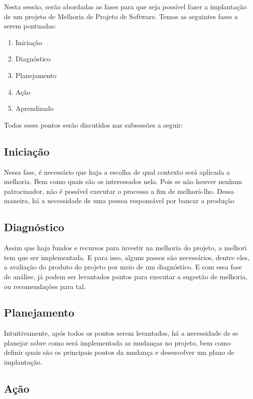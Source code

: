 Nesta sessão, serão abordadas as fases para que seja possível fazer a implantação
de um projeto de Melhoria de Projeto de Software. Temos as seguintes fases a
serem pontuadas:

\begin{enumerate}
    \item Iniciação
    \item Diagnóstico
    \item Planejamento
    \item Ação
    \item Aprendizado
\end{enumerate}

Todos esses pontos serão discutidos nas subsessões a seguir:

\subsection{Iniciação}
\label{sub:Iniciação}

Nessa fase, é necessário que haja a escolha de qual contexto será aplicada a melhoria.
Bem como quais são os interessados nela. Pois se não houver nenhum patrocinador,
não é possível executar o processo a fim de melhorá-lho. Dessa maneira, há a
necessidade de uma pessoa responsável por bancar a produção

\subsection{Diagnóstico}
\label{sub:Diagnóstico}

Assim que haja fundos e recursos para investir na melhoria do projeto, a melhori
tem que ser implementada. E para isso, alguns passos são necessários, dentre eles,
a avaliação do produto do projeto por meio de um diagnóstico. E com essa fase de
análise, já podem ser levantados pontos para executar a sugestão de melhoria, ou
recomendações para tal.

\subsection{Planejamento}
\label{sub:Planejamento}

Intuitivamente, após todos os pontos serem levantados, há a necessidade de se
planejar sobre como será implementada as mudanças no projeto, bem como
definir quais são os principais pontos da mudança e desenvolver um plano de
implantação.

\subsection{Ação}
\label{sub:Ação}


